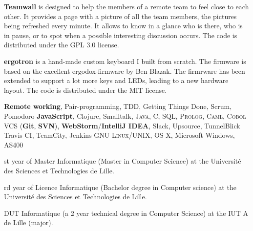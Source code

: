 \begin{rubric}{%
}
\entry*[teamwall] \textbf{Teamwall} is designed to help the members of a remote team to feel close to each other. It provides a page with a picture of all the team members, the pictures being refreshed every minute. It allows to know in a glance who is there, who is in pause, or to spot when a possible interesting discussion occurs. The code is distributed under the GPL 3.0 license.

 \textbf{ergotron} is a hand-made custom keyboard I built from scratch. The firmware is based on the excellent ergodox-firmware by Ben Blazak. The firmrware has been extended to support a lot more keys and LEDs, leading to a new hardware layout. The code is distributed under the MIT license.


\entry*[Agile] \textbf{Remote working}, Pair-programming, TDD, Getting Things Done, Scrum, Pomodoro
\entry*[Programming] \textbf{JavaScript}, Clojure, Smalltalk, \textsc{Java}, C, \textsc{SQL}, \textsc{Prolog}, \textsc{Caml}, \textsc{Cobol}
\entry*[Software] VCS (\textbf{Git}, \textbf{SVN}), \textbf{WebStorm}/\textbf{IntelliJ IDEA}, Slack, Upsource, TunnelBlick
 Travis CI, TeamCity, Jenkins
\entry*[System] \textsc{GNU Linux/UNIX}, OS X, Microsoft Windows, AS400

\textup{st} year of Master Informatique (Master in Computer Science) at the Université des Sciences et Technologies de Lille.

\textup{rd} year of Licence Informatique (Bachelor degree in Computer science) at the Université des Sciences et Technologies de Lille.

\entry*[2009 - 2011]
DUT Informatique (a 2 year technical degree in Computer Science)  at the IUT A de Lille (major).


\end{rubric}
